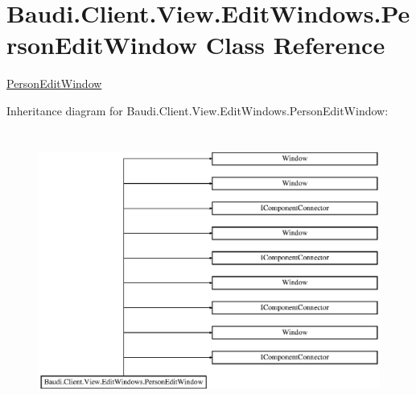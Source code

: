 \hypertarget{class_baudi_1_1_client_1_1_view_1_1_edit_windows_1_1_person_edit_window}{}\section{Baudi.\+Client.\+View.\+Edit\+Windows.\+Person\+Edit\+Window Class Reference}
\label{class_baudi_1_1_client_1_1_view_1_1_edit_windows_1_1_person_edit_window}


\hyperlink{class_baudi_1_1_client_1_1_view_1_1_edit_windows_1_1_person_edit_window}{Person\+Edit\+Window}  


Inheritance diagram for Baudi.\+Client.\+View.\+Edit\+Windows.\+Person\+Edit\+Window\+:\begin{figure}[H]
\begin{center}
\leavevmode
\includegraphics[height=9.210526cm]{class_baudi_1_1_client_1_1_view_1_1_edit_windows_1_1_person_edit_window}
\end{center}
\end{figure}
